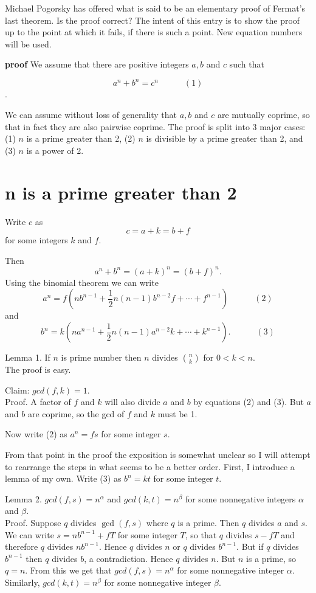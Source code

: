 \documentclass[12pt]{article}
\begin{document}
Michael Pogorsky has offered what is said to be an elementary proof of Fermat's
last theorem. Is the proof correct? The intent
of this entry is to show the proof up to the point at which it fails,
if there is such a point. New equation numbers will be used. 

\textbf{proof}
We assume that there are positive integers $a,b$ and $c$ such that

$$
a^n + b^n = c^n \quad \quad \quad (1)
$$.

We can assume without loss of generality that $a,b$ and $c$ are mutually coprime, so that in fact
they are also pairwise coprime. The proof is split into 3 major cases:
(1) $n$ is a prime greater than 2, (2) $n$ is divisible by a prime greater than 2,
and (3) $n$ is a power of 2.

\section{n is a prime greater than 2}


Write $c$ as
$$
c = a + k = b+f
$$
for some integers $k$ and $f$.

Then
$$
a^n + b^n =  (a+k)^n = (b+f)^n .
$$
Using the binomial theorem we can write 
$$
a^n = f(nb^{n-1} + \frac{1}{2}n(n-1)b^{n-2}f+ \cdots + f^{n-1})  \quad \quad \quad (2)
$$
and
$$
b^n = k(na^{n-1} + \frac{1}{2}n(n-1)a^{n-2}k + \cdots + k^{n-1}). \quad \quad \quad (3)
$$

Lemma 1. If $n$ is prime number then $n$ divides $\binom{n}{k}$ for $0 < k < n$.\\
The proof is easy.

Claim: $gcd(f,k) = 1$.  \\
Proof. A factor of $f$ and $k$ will also divide $a$ and $b$ by equations (2) 
and (3). But $a$ and $b$ are coprime, so the gcd of $f$ and $k$ must be 1.

Now write (2) as $a^n = fs$ for some integer $s$. 

From that point in the proof the exposition is somewhat unclear 
so I will attempt to rearrange the steps in what seems to be a better order. 
First, I introduce a lemma of my own. 
Write (3) as $b^n = kt$ for some integer $t$. 

Lemma 2. $gcd(f,s) = n^{\alpha}$ and   $gcd(k,t) = n^{\beta}$ for
some nonnegative integers  $\alpha$ and $\beta$. \\
Proof. Suppose $q$ divides $\gcd(f,s)$ where $q$ is a prime. Then $q$ divides $a$ and $s$. 
We can write $s=nb^{n-1} + fT$ for some integer $T$, so that $q$ divides $s-fT$ and therefore
$q$ divides $nb^{n-1}$. Hence $q$ divides $n$ or $q$ divides $b^{n-1}$. But if $q$ divides
$b^{n-1}$ then $q$ divides $b$, a contradiction. Hence $q$ divides $n$. But $n$ is a prime, so
$q=n$. From this we get that $gcd(f,s) = n^{\alpha}$ for some nonnegative integer $\alpha$.
Similarly, $gcd(k,t) = n^{\beta}$ for
some nonnegative integer $\beta$. \\
\end{document}

